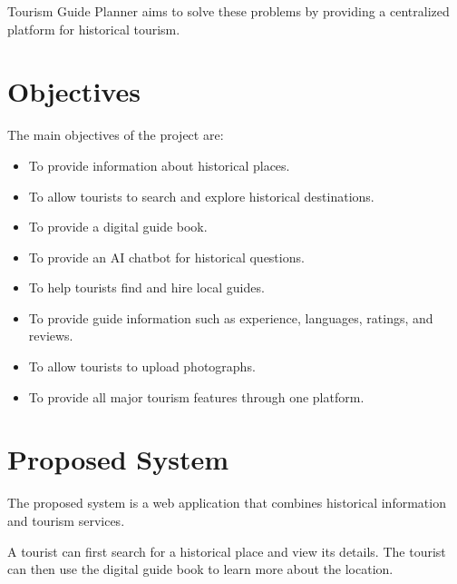 \documentclass[12pt,a4paper]{article}
\begin{document}
Tourism Guide Planner aims to solve these problems by providing a
centralized platform for historical tourism.



\section{Objectives}

The main objectives of the project are:

\begin{itemize}[leftmargin=*]

    \item To provide information about historical places.

    \item To allow tourists to search and explore historical destinations.

    \item To provide a digital guide book.

    \item To provide an AI chatbot for historical questions.

    \item To help tourists find and hire local guides.

    \item To provide guide information such as experience, languages,
    ratings, and reviews.

    \item To allow tourists to upload photographs.

    \item To provide all major tourism features through one platform.

\end{itemize}



\section{Proposed System}

The proposed system is a web application that combines historical
information and tourism services.

A tourist can first search for a historical place and view its details.
The tourist can then use the digital guide book to learn more about the
location.
\end{document}
